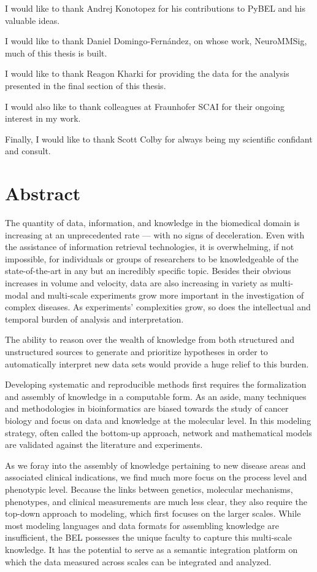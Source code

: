 \documentclass[twoside, 12pt,  footinclude=true,  headinclude=true,  cleardoublepage=empty]{scrbook}
\begin{document}
I would like to thank Andrej Konotopez for his contributions to PyBEL and his valuable ideas.

I would like to thank Daniel Domingo-Fernández, on whose work, NeuroMMSig, much of this thesis is built.

I would like to thank Reagon Kharki for providing the data for the analysis presented in the final section of this thesis.

I would also like to thank colleagues at Fraunhofer SCAI for their ongoing interest in my work.

Finally, I would like to thank Scott Colby for always being my scientific confidant and consult.

\endgroup	

\tableofcontents

\listoffigures
\listoftables

\chapter*{Abstract}
The quantity of data, information, and knowledge in the biomedical domain is increasing at an unprecedented rate — with no signs of deceleration. Even with the assistance of information retrieval technologies, it is overwhelming, if not impossible, for individuals or groups of researchers to be knowledgeable of the state-of-the-art in any but an incredibly specific topic. Besides their obvious increases in volume and velocity, data are also increasing in variety as multi-modal and multi-scale experiments grow more important in the investigation of complex diseases. As experiments' complexities grow, so does the intellectual and temporal burden of analysis and interpretation. 

The ability to reason over the wealth of knowledge from both structured and unstructured sources to generate and prioritize hypotheses in order to automatically interpret new data sets would provide a huge relief to this burden. 

Developing systematic and reproducible methods first requires the formalization and assembly of knowledge in a computable form. As an aside, many techniques and methodologies in bioinformatics are biased towards the study of cancer biology and focus on data and knowledge at the molecular level. In this modeling strategy, often called the bottom-up approach, network and mathematical models are validated against the literature and experiments. 

As we foray into the assembly of knowledge pertaining to new disease areas and associated clinical indications, we find much more focus on the process level and phenotypic level. Because the links between genetics, molecular mechanisms, phenotypes, and clinical measurements are much less clear, they also require the top-down approach to modeling, which first focuses on the larger scales.  While most modeling languages and data formats for assembling knowledge are insufficient, the \ac{BEL} possesses the unique faculty to capture this multi-scale knowledge. It has the potential to serve as a semantic integration platform on which the data measured across scales can be integrated and analyzed. 
\end{document}
